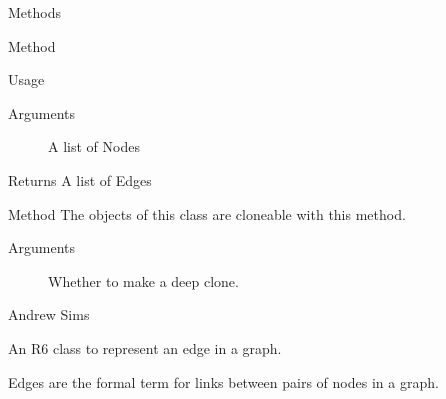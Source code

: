 \documentclass[a4paper]{book}
\begin{document}
\begin{Section}{Methods}
\begin{SubSection}{Method }
\begin{SubSubSection}{Usage}
\end{SubSubSection}


%
\begin{SubSubSection}{Arguments}

\begin{description}

\item[] A list of Nodes

\end{description}


\end{SubSubSection}

%
\begin{SubSubSection}{Returns}
A list of Edges
\end{SubSubSection}

\end{SubSection}



\hypertarget{method-clone}{}
%
\begin{SubSection}{Method }
The objects of this class are cloneable with this method.
%


%
\begin{SubSubSection}{Arguments}

\begin{description}

\item[] Whether to make a deep clone.

\end{description}


\end{SubSubSection}

\end{SubSection}

\end{Section}
%
\begin{Author}\relax
Andrew Sims 
\end{Author}
%
\begin{Description}\relax
An R6 class to represent an edge in a graph.
\end{Description}
%
\begin{Details}\relax
Edges are the formal term for links between pairs of nodes in a
graph.
\end{Details}
\end{document}
